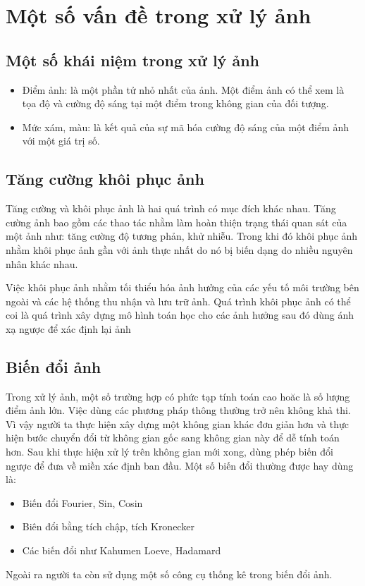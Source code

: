 \documentclass[12pt,oneside,a4]{report}
\begin{document}
\section{Một số vấn đề trong xử lý ảnh}
\subsection{Một số khái niệm trong xử lý ảnh}
\begin{itemize}
\item Điểm ảnh: là một phần tử nhỏ nhất của ảnh. Một điểm ảnh có thể xem là tọa độ và cường độ sáng tại một điểm trong không gian của đối tượng. 
\item Mức xám, màu: là kết quả của sự mã hóa cường độ sáng của một điểm ảnh với một giá trị số.
\end{itemize}
\subsection{Tăng cường khôi phục ảnh}
Tăng cường và khôi phục ảnh là hai quá trình có mục đích khác nhau. Tăng cường ảnh bao gồm các thao tác nhằm làm hoàn thiện trạng thái quan sát của một ảnh như: tăng cường độ tương phản, khử nhiễu. Trong khi đó khôi phục ảnh nhằm khôi phục ảnh  gần với ảnh thực nhất do nó bị biến dạng do nhiều nguyên nhân khác nhau.

Việc khôi phục ảnh nhằm tối thiểu hóa ảnh hưởng của các yếu tố môi trường bên ngoài và các hệ thống thu nhận và lưu trữ ảnh. Quá trình khôi phục ảnh có thể coi là quá trình xây dựng mô hình toán học cho các ảnh hưởng sau đó dùng ánh xạ ngược để xác định lại ảnh 
\subsection{Biến đổi ảnh}
Trong xử lý ảnh, một số trường hợp có phức tạp tính toán cao hoăc là số lượng điểm ảnh lớn. Việc dùng các phương pháp thông thường trở nên không khả thi. Vì vậy người ta thực hiện xây dựng một không gian khác đơn giản hơn và thực hiện bước chuyển đổi từ không gian gốc sang không gian này để dễ tính toán hơn. Sau khi thực hiện xử lý trên không gian mới xong, dùng phép biến đổi ngược để đưa về miền xác định ban đầu. Một số biến đổi thường được hay dùng là:
\begin{itemize}
\item Biến đổi Fourier, Sin,  Cosin
\item Biên đổi bằng tích chập, tích Kronecker
\item Các biến đổi như Kahumen Loeve, Hadamard
\end{itemize}
Ngoài ra người ta còn sử dụng một số công cụ thống kê trong biến đổi ảnh.
\end{document}
